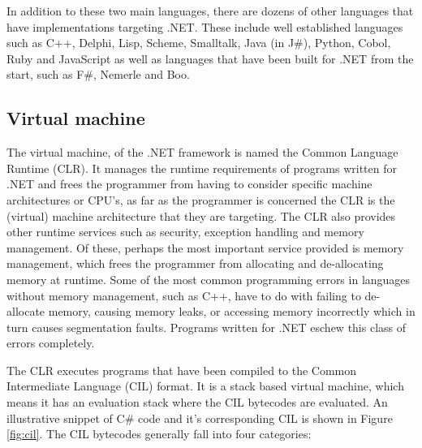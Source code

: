 	In addition to these two main languages, there are dozens of other 
	languages that have implementations targeting .NET. These include well 
	established languages such as C++, Delphi, Lisp, Scheme, Smalltalk, Java 
	(in J\#), Python, Cobol, Ruby and JavaScript as well as languages that have 
	been built for .NET from the start, such as F\#, Nemerle and Boo.

\subsection{Virtual machine}

	The virtual machine, of the .NET framework is named the Common Language 
	Runtime (CLR). It manages the runtime requirements of programs written for 
	.NET and frees the programmer from having to consider specific machine 
	architectures or CPU's, as far as the programmer is concerned the CLR is the 
	(virtual) machine architecture that they are targeting. The CLR also provides 
	other runtime services such as security, exception handling and memory 
	management. Of these, perhaps the most important service provided is memory 
	management, which frees the programmer from allocating and de-allocating 
	memory at runtime. Some of the most common programming errors in languages 
	without memory management, such as C++, have to do with failing to de-allocate 
	memory, causing memory leaks, or accessing memory incorrectly which in turn 
	causes segmentation faults. Programs written for .NET eschew this class of 
	errors completely.
	
	The CLR executes programs that have been compiled to the Common Intermediate 
	Language (CIL) format. It is a stack based virtual machine, which means it has
	an evaluation stack where the CIL bytecodes are evaluated. An illustrative 
	snippet of C\# code and it's corresponding CIL is shown in 
	Figure \ref{fig:cil}. The CIL bytecodes generally fall into four categories:
		
